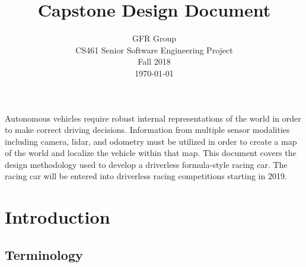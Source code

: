 \documentclass[10pt, onecolumn, draftclsnofoot, letterpaper,compsoc]{IEEEtran}
\title{Capstone Design Document}
\author{GFR Group \\
        CS461 Senior Software Engineering Project \\
        Fall 2018 \\
        \today}
\begin{document}
\maketitle

Autonomous vehicles require robust internal representations of the world in order to make correct driving decisions. Information from multiple sensor modalities including camera, lidar, and odometry must be utilized in order to create a map of the world and localize the vehicle within that map. This document covers the design methodology used to develop a driverless formula-style racing car. The racing car will be entered into driverless racing competitions starting in 2019.

\newpage
\tableofcontents
\newpage

\section{Introduction}

\subsection{Terminology}
\end{document}
